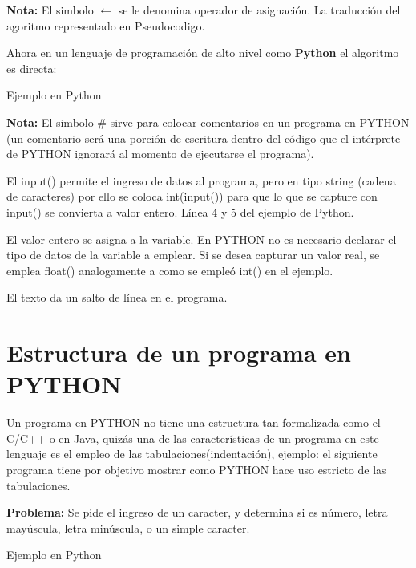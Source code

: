 \documentclass[12pt, a4paper]{article}
\begin{document}
\textbf{Nota:} El simbolo $\leftarrow$ se le denomina operador de asignación. La traducción del agoritmo representado en Pseudocodigo.

Ahora en un lenguaje de programación de alto nivel como \textbf{Python} el algoritmo es directa:

\begin{center}
    Ejemplo en Python
\end{center}



\textbf{Nota:} El simbolo \# sirve para colocar comentarios en un programa en PYTHON (un comentario será una porción de escritura dentro del código que el intérprete de PYTHON ignorará al momento de ejecutarse el programa).

El input() permite el ingreso de datos al programa, pero en tipo string (cadena de caracteres) por ello se coloca int(input()) para que lo que se capture con input() se convierta a valor entero. Línea 4 y 5 del ejemplo de Python.

El valor entero se asigna a la variable. En PYTHON no es necesario declarar el tipo de datos de la variable a emplear. Si se desea capturar un valor real, se emplea float() analogamente a como se empleó int() en el ejemplo.

El texto  da un salto de línea en el programa.

\section{Estructura de un programa en PYTHON}
Un programa en PYTHON no tiene una estructura tan formalizada como el C/C++ o en Java, quizás una de las características de un programa en este lenguaje es el empleo de las tabulaciones(indentación), ejemplo: el siguiente programa tiene por objetivo mostrar como PYTHON hace uso estricto de las tabulaciones.

\textbf{Problema:} Se pide el ingreso de un caracter, y determina si es número, letra mayúscula, letra minúscula, o un simple caracter.

\begin{center}
    Ejemplo en Python
\end{center}


\end{document}
